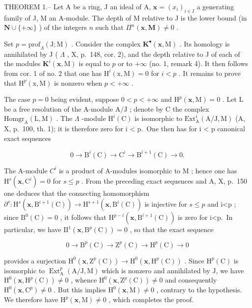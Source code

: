 THEOREM 1.-- Let A be a ring, J an ideal of A, \(\mathbf{x} = (x_i)_{i \in I}\) a generating family of J, M an A-module. The depth of M relative to J is the lower bound (in \(\mathbf{N} \cup \{+\infty\}\) ) of the integers \(n\) such that \(\Pi^n(\mathbf{x}, \mathbf{M}) \neq 0\) .

Set \(p = \text{prof}_{\Lambda}(\text{J}; \text{M})\) . Consider the complex \(\mathbf{K}^{\bullet}(\mathbf{x}, \text{M})\) . Its homology is annihilated by J ( \(\Lambda\) , X, p.~148, cor. 2), and the depth relative to J of each of the modules \(\mathbf{K}^{i}(\mathbf{x}, \text{M})\) is equal to \(p\) or to \(+\infty\) (no. 1, remark 4). It then follows from cor. 1 of no. 2 that one has \(\text{H}^{i}(\text{x}, \text{M}) = 0\) for \(i < p\) . It remains to prove that \(\text{H}^{p}(\text{x}, \text{M})\) is nonzero when \(p < +\infty\) .

The case \(p = 0\) being evident, suppose \(0 < p < +\infty\) and \(\mathrm{H}^p(\mathbf{x},\mathrm{M}) = 0\) . Let L be a free resolution of the A-module \(\mathrm{A / J}\) ; denote by C the complex \(\mathrm{Homgr}_{\mathrm{A}}(\mathrm{L},\mathrm{M})\) . The \(\Lambda\) -module \(\mathrm{H}^i(\mathrm{C})\) is isomorphic to \(\mathrm{Ext}_{\mathrm{A}}^i(\mathrm{A / J},\mathrm{M})\) (A, X, p.~100, th. 1); it is therefore zero for i \textless{} p.~One then has for i \textless{} p canonical exact sequences

\[
0 \rightarrow \mathrm{B} ^ {i} (\mathrm{C}) \rightarrow \mathrm{C} ^ {i} \rightarrow \mathrm{B} ^ {i + 1} (\mathrm{C}) \rightarrow 0.
\]

The A-module \(C^{i}\) is a product of A-modules isomorphic to M ; hence one has \(\mathrm{H}^{s}(\mathbf{x},\mathrm{C}^{i})=0\) for \(s\leqslant p\) . From the preceding exact sequences and A, X, p.~150 one deduces that the connecting homomorphism \(\partial^{s}:\mathrm{H}^{s}(\mathbf{x},\mathrm{B}^{i+1}(\mathrm{C}))\longrightarrow\mathrm{H}^{s+1}(\mathbf{x},\mathrm{B}^{i}(\mathrm{C}))\) is injective for \(s\leqslant p\) and i\textless p ; since \(\mathrm{B}^{0}(\mathrm{C})=0\) , it follows that \(\mathrm{H}^{p-i}(\mathbf{x},\mathrm{B}^{i+1}(\mathrm{C}))\) is zero for i\textless p.~In particular, we have \(\mathrm{II}^{1}(\mathbf{x},\mathrm{B}^{p}(\mathrm{C}))=0\) , so that the exact sequence

\[
0 \to \mathrm{B} ^ {p} (\mathrm{C}) \to \mathrm{Z} ^ {p} (\mathrm{C}) \to \mathrm{H} ^ {p} (\mathrm{C}) \to 0
\]

provides a surjection \(\mathrm{H}^{0}(\mathbf{x},\mathrm{Z}^{p}(\mathrm{C}))\longrightarrow\mathrm{H}^{0}(\mathbf{x},\mathrm{H}^{p}(\mathrm{C}))\) . Since \(\mathrm{H}^{p}(\mathrm{C})\) is isomorphic to \(\operatorname{Ext}_{\mathrm{A}}^{p}(\mathrm{A}/\mathrm{J},\mathrm{M})\) which is nonzero and annihilated by J, we have \(\mathrm{H}^{0}(\mathbf{x},\mathrm{H}^{p}(\mathrm{C}))\neq0\) , whence \(\mathrm{H}^{0}(\mathbf{x},\mathrm{Z}^{p}(\mathrm{C}))\neq0\) and consequently \(\mathrm{H}^{0}(\mathbf{x},\mathrm{C}^{p})\neq0\) . But this implies \(\mathrm{H}^{0}(\mathbf{x},\mathrm{M})\neq0\) , contrary to the hypothesis. We therefore have \(\mathrm{H}^{p}(\mathbf{x},\mathrm{M})\neq0\) , which completes the proof.

